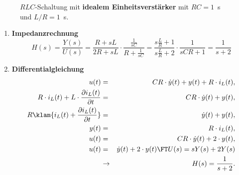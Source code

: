 {\label{ZRD_BSP_gross} %
\begin{figure}[!htb] 
  \vspace*{-2mm}\begin{center}
    \vspace*{-3mm}\caption{$RLC$-Schaltung
      mit {\bf idealem
        Einheitsverst\"arker} mit
      $RC=1$~s und $L/R=1$~s.}\label{ZVD_ABB_last_example}
\end{center}
\vspace*{-6mm}
\end{figure}
\begin{enumerate}
 \item[]{\bf Impedanzrechnung}
\begin{equation*}
  H(s)=\frac{Y(s)}{U(s)}=\frac{R+sL}{2R+sL}\cdot\frac{\frac{1}{sC}}{R+\frac{1}{sC}}=\frac{s\frac{L}{R}+1}{s\frac{L}{R}+2}\cdot\frac{1}{sCR+1}=\frac{1}{s+2}
\end{equation*}
 \item[]{\bf Differentialgleichung}
\begin{eqnarray}
 u(t) &=& CR\cdot\dot{y}(t)+y(t)+R\cdot i_L(t),\label{ZRD_FORM_BSP1}\\
 R\cdot i_L(t) +L\cdot \frac{\partial i_L(t)}{\partial t}&=& CR\cdot\dot{y}(t)+y(t),\label{ZRD_FORM_BSP2}\\
 R\klam{i_L(t) +\frac{\partial i_L(t)}{\partial t}}&=& \dot{y}(t)+y(t), \nonumber \\
 y(t) &=& R\cdot i_L(t),\nonumber \\
 u(t) &=& CR\cdot\dot{y}(t)+2\cdot y(t),\nonumber \\
 u(t) &=& \dot{y}(t)+2\cdot y(t)\FT U(s)=sY(s)+2Y(s)\nonumber \\
 &\rightarrow& H(s)=\frac{1}{s+2}.\nonumber
\end{eqnarray}


\end{enumerate}}
